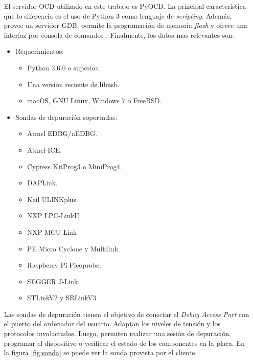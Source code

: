 El servidor OCD utilizado en este trabajo es PyOCD.
La principal característica que lo diferencia es el uso de Python 3 como lenguaje de \emph{scripting}.
Además, provee un servidor GDB, permite la programación de memoria \emph{flash} y ofrece una interfaz por consola de comandos \citep{WEBSITE:pyocd}.
Finalmente, los datos mas relevantes son:

\begin{itemize}
    \item Requerimientos:
        \begin{itemize}
            \item Python 3.6.0 o superior.
            \item Una versión reciente de libusb.
            \item macOS, GNU Linux, Windows 7 o FreeBSD.
        \end{itemize}
    \item Sondas de depuración soportadas:
        \begin{itemize}
            \item Atmel EDBG/nEDBG.
            \item Atmel-ICE.
            \item Cypress KitProg3 o MiniProg4.
            \item DAPLink.
            \item Keil ULINKplus.
            \item NXP LPC-LinkII
            \item NXP MCU-Link
            \item PE Micro Cyclone y Multilink.
            \item Raspberry Pi Picoprobe.
            \item SEGGER J-Link.
            \item STLinkV2 y SRLinkV3.
        \end{itemize}
\end{itemize}




Las sondas de depuración tienen el objetivo de conectar el \emph{Debug Access Port} con el puerto del ordenador del usuario.
Adaptan los niveles de tensión y los protocolos involucrados.
Luego, permiten realizar una sesión de depuración, programar el dispositivo o verificar el estado de los componentes en la placa.
En la figura \ref{fig:sonda} se puede ver la sonda provista por el cliente.

